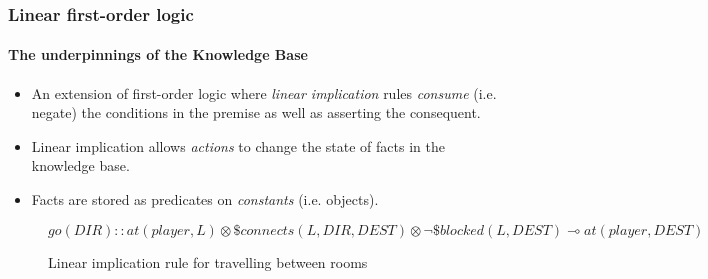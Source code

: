 \begin{frame}
    \frametitle{Linear first-order logic}
    \framesubtitle{The underpinnings of the Knowledge Base}

    \begin{itemize}
        \item An extension of first-order logic where \emph{linear
            implication} rules \emph{consume} (i.e. negate) the
            conditions in the premise as well as asserting the
            consequent.

        \item Linear implication allows \emph{actions} to change the
            state of facts in the knowledge base.

        \item Facts are stored as predicates on \emph{constants} (i.e.
            objects).
    \end{itemize}

    \begin{figure}
        {\tiny
            \[
                go(DIR) :: at(player, L) \otimes
                \$ connects(L, DIR, DEST) \otimes
                \lnot \$ blocked(L, DEST)
                \multimap at(player, DEST) 
            \]
        }
        \caption*{Linear implication rule for travelling between rooms}
    \end{figure}

    \parencite{cote_textworld_2019}

\end{frame}

